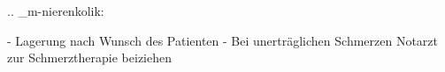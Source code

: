 
.. _m-nierenkolik:

%
\begin{itemize}
  -   Lagerung nach Wunsch des Patienten
  -   Bei unerträglichen Schmerzen Notarzt zur
  Schmerztherapie beiziehen
\end{itemize}
